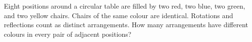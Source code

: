 Eight positions around a circular table are filled by two red, two blue, two green, and two yellow chairs. Chairs of the same colour are identical. Rotations and reflections count as distinct arrangements. How many arrangements have different colours in every pair of adjacent positions?
